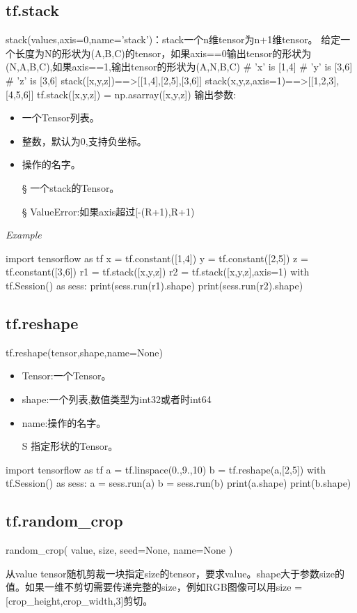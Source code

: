 \subsection{tf.stack}
stack(values,axis=0,name='stack')：stack一个n维tensor为n+1维tensor。
给定一个长度为N的形状为(A,B,C)的tensor，如果axis==0输出tensor的形状为(N,A,B,C),如果axis==1,输出tensor的形状为(A,N,B,C)
\# 'x' is [1,4]\newline
\# 'y' is [3,6]\newline
\# 'z' is [3,6]\newline
stack([x,y,z])==>[[1,4],[2,5],[3,6]]\newline
stack(x,y,z,axis=1)==>[[1,2,3],[4,5,6]]\newline
tf.stack([x,y,z]) = np.asarray([x,y,z])\newline
输出参数:
\begin{itemize}
	\item 一个Tensor列表。
	\item 整数，默认为0,支持负坐标。
	\item 操作的名字。
	\item[\S] 一个stack的Tensor。
	\item[\S] ValueError:如果axis超过[-(R+1),R+1)
\end{itemize}
\textsl{Example}
\begin{python}
import tensorflow as tf
x = tf.constant([1,4])
y = tf.constant([2,5])
z = tf.constant([3,6])
r1 = tf.stack([x,y,z])
r2 = tf.stack([x,y,z],axis=1)
with tf.Session() as sess:
    print(sess.run(r1).shape)
    print(sess.run(r2).shape)
\end{python}
\subsection{tf.reshape}
tf.reshape(tensor,shape,name=None)
\begin{itemize}
	\item Tensor:一个Tensor。
	\item shape:一个列表,数值类型为int32或者时int64
	\item name:操作的名字。
	\item[S] 指定形状的Tensor。
\end{itemize}
\begin{python}
import tensorflow as tf
a = tf.linspace(0.,9.,10)
b = tf.reshape(a,[2,5])
with tf.Session() as sess:
    a = sess.run(a)
    b = sess.run(b)
print(a.shape)
print(b.shape)
\end{python}
\subsection{tf.random\_crop}
\begin{python}
random_crop(
    value,
    size,
    seed=None,
    name=None
)
\end{python}
从value tensor随机剪裁一块指定size的tensor，要求value。shape大于参数size的值。如果一维不剪切需要传递完整的size，例如RGB图像可以用size = [crop\_height,crop\_width,3]剪切。

